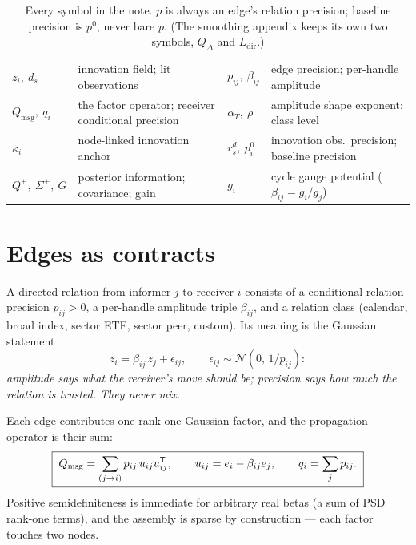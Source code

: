 \documentclass[11pt]{article}
\newcommand{\Qmsg}{Q_{\mathrm{msg}}}
\newcommand{\Qdel}{Q_{\Delta}}
\newcommand{\Ldir}{L_{\mathrm{dir}}}
\begin{document}
\begin{table}[H]
\centering\footnotesize
\setlength{\tabcolsep}{3pt}
\begin{tabular}{@{}llll@{}}
\toprule
$z_i,\ d_s$ & innovation field; lit observations &
$p_{ij},\ \beta_{ij}$ & edge precision; per-handle amplitude\\[2pt]
$\Qmsg,\ q_i$ & the factor operator; receiver conditional precision &
$\alpha_T,\ \rho$ & amplitude shape exponent; class level\\[2pt]
$\kappa_i$ & node-linked innovation anchor &
$r^d_s,\ p^0_i$ & innovation obs.\ precision; baseline precision\\[2pt]
$Q^+,\ \Sigma^+,\ G$ & posterior information; covariance; gain &
$g_i$ & cycle gauge potential ($\beta_{ij}=g_i/g_j$)\\
\bottomrule
\end{tabular}
\caption{Every symbol in the note.  $p$ is always an edge's relation
precision; baseline precision is $p^0$, never bare $p$.  (The smoothing
appendix keeps its own two symbols, $\Qdel$ and $\Ldir$.)}
\label{tab:ledger}
\end{table}

\section{Edges as contracts}
\label{sec:contracts}

\begin{definition}
\label{def:edge}
A directed relation from informer $j$ to receiver $i$ consists of a
conditional relation precision $p_{ij}>0$, a per-handle amplitude triple
$\beta_{ij}$, and a relation class (calendar, broad index, sector ETF,
sector peer, custom).  Its meaning is the Gaussian statement
\[
z_i=\beta_{ij}\,z_j+\epsilon_{ij},
\qquad \epsilon_{ij}\sim\mathcal N(0,\,1/p_{ij}):
\]
\emph{amplitude says what the receiver's move should be; precision says
how much the relation is trusted.  They never mix.}
\end{definition}

Each edge contributes one rank-one Gaussian factor, and the propagation
operator is their sum:
\begin{equation}
\boxed{\;
\Qmsg=\sum_{(j\to i)}p_{ij}\,u_{ij}u_{ij}\T,
\qquad
u_{ij}=e_i-\beta_{ij}e_j,
\qquad
q_i=\sum_j p_{ij}.
\;}
\label{eq:qmsg}
\end{equation}
Positive semidefiniteness is immediate for arbitrary real betas (a sum
of PSD rank-one terms), and the assembly is sparse by construction ---
each factor touches two nodes.
\end{document}
